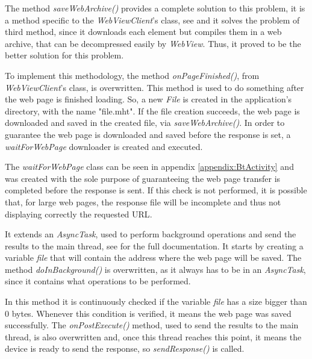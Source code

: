 The method \textit{saveWebArchive()} provides a complete solution to this problem, it is a method specific to the \textit{WebViewClient}'s class, see \cite{webview} and it solves the problem of third method, since it downloads each element but compiles them in a web archive, that can be decompressed easily by \textit{WebView}. Thus, it proved to be the better solution for this problem.

To implement this methodology, the method \textit{onPageFinished()}, from \textit{WebViewClient}'s class, is overwritten. This method is used to do something after the web page is finished loading. So, a new \textit{File} is created in the application's directory, with the name "file.mht". If the file creation succeeds, the web page is downloaded and saved in the created file, via \textit{saveWebArchive()}. In order to guarantee the web page is downloaded and saved before the response is set, a \textit{waitForWebPage} downloader is created and executed.

The \textit{waitForWebPage} class can be seen in appendix \ref{appendix:BtActivity} and was created with the sole purpose of guaranteeing the web page transfer is completed before the response is sent. If this check is not performed, it is possible that, for large web pages, the response file will be incomplete and thus not displaying correctly the requested \gls{URL}.

It extends an \textit{AsyncTask}, used to perform background operations and send the results to the main thread, see \cite{async} for the full documentation. It starts by creating a variable \textit{file} that will contain the address where the web page will be saved. The method \textit{doInBackground()} is overwritten, as it always has to be in an \textit{AsyncTask}, since it contains what operations to be performed.

In this method it is continuously checked if the variable \textit{file} has a size bigger than 0 bytes. Whenever this condition is verified, it means the web page was saved successfully. The \textit{onPostExecute()} method, used to send the results to the main thread, is also overwritten and, once this thread reaches this point, it means the device is ready to send the response, so \textit{sendResponse()} is called.

